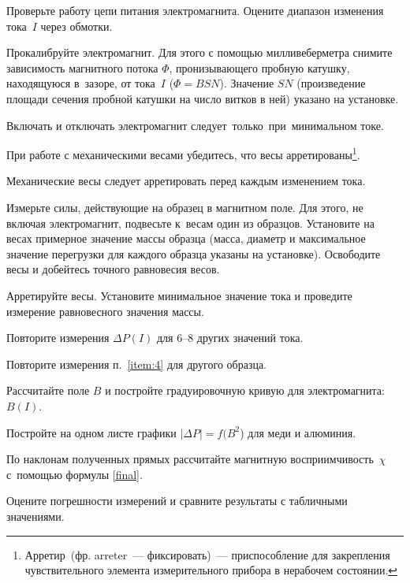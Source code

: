 \begin{lab:task}



\item Проверьте работу цепи питания электромагнита. Оцените диапазон изменения
тока~$I$ через обмотки.

\item Прокалибруйте электромагнит. Для этого с помощью милливеберметра снимите
зависимость магнитного потока $\Phi$,
пронизывающего пробную катушку, находящуюся в~зазоре, от тока~$I$ ($\Phi=BSN$).
Значение $SN$ (произведение площади
сечения пробной катушки на число витков в ней) указано на установке.

\begin{lab:warning}
Включать и отключать электромагнит следует~только~при~минимальном токе.
\end{lab:warning}

\item При работе с механическими весами убедитесь,
что весы арретированы\footnote{Арретир~(фр. arreter~---
фиксировать)~--- приспособление для закрепления
чувствительного элемента измерительного прибора в нерабочем состоянии.}.

\begin{lab:warning}
Механические весы следует арретировать перед каждым изменением тока.
\end{lab:warning}

\item \label{item:4} Измерьте силы, действующие на образец в магнитном поле. Для
этого, не включая электромагнит, подвесьте к~весам
один из образцов. Установите на весах примерное значение массы образца (масса,
диаметр и максимальное значение
перегрузки для каждого образца указаны на установке). Освободите весы и
добейтесь точного равновесия весов.

Арретируйте весы. Установите минимальное значение тока и проведите измерение
равновесного значения массы.

Повторите измерения $\Delta P(I)$ для 6--8 других значений тока.

\item Повторите измерения п.~\ref{item:4} для другого образца.


	\item Рассчитайте поле $B$ и постройте градуировочную кривую для
электромагнита: $B(I)$.
	\item Постройте на одном листе графики $|\Delta P|=f(B^2$) для меди и
алюминия.
	\item По наклонам полученных прямых рассчитайте магнитную восприимчивость~$\chi$
    с~помощью формулы \eqref{final}.
	\item Оцените погрешности измерений и сравните результаты с табличными
значениями.

\end{lab:task}


